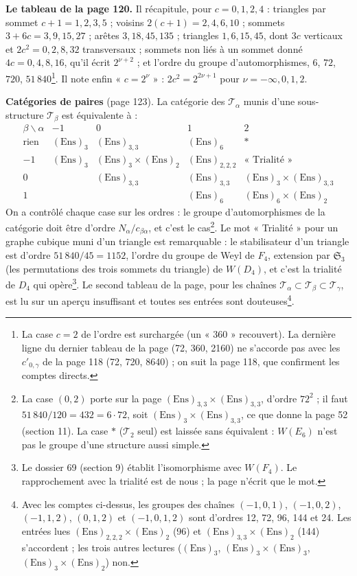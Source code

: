 \documentclass[11pt,a4paper]{article}
\begin{document}
\textbf{Le tableau de la page 120.} Il récapitule, pour $c = 0, 1, 2, 4$ :
triangles par sommet $c + 1 = 1, 2, 3, 5$ ; voisins $2(c+1) = 2, 4, 6, 10$ ;
sommets $3 + 6c = 3, 9, 15, 27$ ; arêtes $3, 18, 45, 135$ ; triangles $1, 6, 15,
45$, dont $3c$ verticaux et $2c^2 = 0, 2, 8, 32$ transversaux ; sommets non liés à
un sommet donné $4c = 0, 4, 8, 16$, qu'il écrit $2^{\nu+2}$ ; et l'ordre du groupe
d'automorphismes, $6$, $72$, $720$, $51\,840$\footnote{La case $c = 2$ de l'ordre
est surchargée (un « 360 » recouvert). La dernière ligne du dernier tableau de la
page (72, 360, 2160) ne s'accorde pas avec les $c'_{0,\gamma}$ de la page 118
(72, 720, 8640) ; on suit la page 118, que confirment les comptes directs.}.
Il note enfin « $c = 2^\nu$ » : $2c^2 = 2^{2\nu+1}$ pour $\nu = -\infty, 0, 1,
2$.

\textbf{Catégories de paires} (page 123). La catégorie des $\mathcal{T}_\alpha$
munis d'une sous-structure $\mathcal{T}_\beta$ est équivalente à :
\[
\begin{array}{c|cccc}
\beta \backslash \alpha & -1 & 0 & 1 & 2 \\ \hline
\text{rien} & (\mathrm{Ens})_3 & (\mathrm{Ens})_{3,3} & (\mathrm{Ens})_6 &
\ast \\
-1 & (\mathrm{Ens})_3 & (\mathrm{Ens})_3 \times (\mathrm{Ens})_2 &
(\mathrm{Ens})_{2,2,2} & \text{« Trialité »} \\
0 & & (\mathrm{Ens})_{3,3} & (\mathrm{Ens})_{3,3} & (\mathrm{Ens})_3 \times
(\mathrm{Ens})_{3,3} \\
1 & & & (\mathrm{Ens})_6 & (\mathrm{Ens})_6 \times (\mathrm{Ens})_2
\end{array}
\]
On a contrôlé chaque case sur les ordres : le groupe d'automorphismes de la
catégorie doit être d'ordre $N_\alpha / c_{\beta\alpha}$, et c'est le
cas\footnote{La case $(0, 2)$ porte sur la page $(\mathrm{Ens})_{3,3} \times
(\mathrm{Ens})_{3,3}$, d'ordre $72^2$ ; il faut $51\,840/120 = 432 = 6 \cdot 72$,
soit $(\mathrm{Ens})_3 \times (\mathrm{Ens})_{3,3}$, ce que donne la page 52
(section 11). La case $\ast$ ($\mathcal{T}_2$ seul) est laissée sans
équivalent : $W(E_6)$ n'est pas le groupe d'une structure aussi simple.}. Le mot
« Trialité » pour un graphe cubique muni d'un triangle est remarquable : le
stabilisateur d'un triangle est d'ordre $51\,840/45 = 1152$, l'ordre du groupe de
Weyl de $F_4$, extension par $\mathfrak{S}_3$ (les permutations des trois sommets
du triangle) de $W(D_4)$, et c'est la trialité de $D_4$ qui opère\footnote{Le
dossier 69 (section 9) établit l'isomorphisme avec $W(F_4)$. Le rapprochement
avec la trialité est de nous ; la page n'écrit que le mot.}. Le second tableau de la
page, pour les chaînes $\mathcal{T}_\alpha \subset \mathcal{T}_\beta \subset
\mathcal{T}_\gamma$, est lu sur un aperçu insuffisant et toutes ses entrées sont
douteuses\footnote{Avec les comptes ci-dessus, les groupes des chaînes $(-1, 0,
1)$, $(-1, 0, 2)$, $(-1, 1, 2)$, $(0, 1, 2)$ et $(-1, 0, 1, 2)$ sont d'ordres 12,
72, 96, 144 et 24. Les entrées lues $(\mathrm{Ens})_{2,2,2} \times
(\mathrm{Ens})_2$ (96) et $(\mathrm{Ens})_{3,3} \times (\mathrm{Ens})_2$ (144)
s'accordent ; les trois autres lectures ($(\mathrm{Ens})_3$, $(\mathrm{Ens})_3
\times (\mathrm{Ens})_3$, $(\mathrm{Ens})_3 \times (\mathrm{Ens})_2$) non.}.
\end{document}
